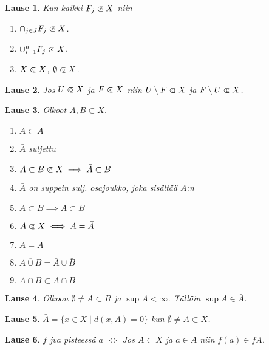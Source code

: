 \documentclass[landscape,a4paper,10pt]{article}
\newcommand\opn{\mathrel{\ooalign{$\subset$\cr
  \hidewidth\hbox{$\circ\mkern.5mu$}\cr}}}
\newcommand\cls{\mathrel{\ooalign{$\subset$\cr
\hidewidth\raise.225ex\hbox{$\text{{\scriptsize c}}\mkern2mu$}\cr}}}
\theoremstyle{customtheoremstyle}
\newtheorem*{theorem}{Lause}
\begin{document}
\begin{multicols*}{3}
\begin{theorem}
  Kun kaikki $F_j \cls X$ niin
  \begin{enumerate}
    \item{$\cap_{j \in J} F_j \cls X$.}
    \item{$\cup_{i=1}^{n} F_j \cls X$.}
    \item{$X \cls X$, $\emptyset \cls X$.}
  \end{enumerate}
\end{theorem}

\begin{theorem}
  Jos $U \opn X$ ja $F \cls X$ niin $U \setminus F \opn X$ ja $F \setminus U
  \cls X$.
\end{theorem}

\begin{theorem}
  Olkoot $A,B \subset X$.
  \begin{enumerate}
    \item[(1)]{$A \subset \bar{A}$}
    \item[(2)]{$\bar{A}$ suljettu}
    \item[(3)]{$A \subset B \cls X \implies \bar{A} \subset B$}
    \item[(4)]{$\bar{A}$ on suppein sulj. osajoukko, joka sisältää $A$:n}
    \item[(5)]{$A \subset B \implies \bar{A} \subset \bar{B}$}
    \item[(6)]{$A \cls X \iff A = \bar{A}$}
    \item[(7)]{$\bar{\bar{A}} = \bar{A}$}
    \item[(8)]{$\overline{A \cup B} = \bar{A} \cup \bar{B}$}
    \item[(9)]{$\overline{A \cap B} \subset \bar{A} \cap \bar{B}$}
  \end{enumerate}
\end{theorem}

\begin{theorem}
  Olkoon $\emptyset \neq A \subset R$ ja $\sup A < \infty$. Tällöin $\sup A \in
  \bar{A}$.
\end{theorem}

\begin{theorem}
  $\bar{A} = \{ x \in X \; | \; d(x,A) = 0 \}$ kun $\emptyset \neq A \subset X$.
\end{theorem}

\begin{theorem}
  $f$ jva pisteessä $a$ $\iff$ Jos $A \subset X$ ja $a \in \bar{A}$ niin
  $f(a) \in \overline{fA}$.
\end{theorem}


\end{multicols*}
\end{document}
